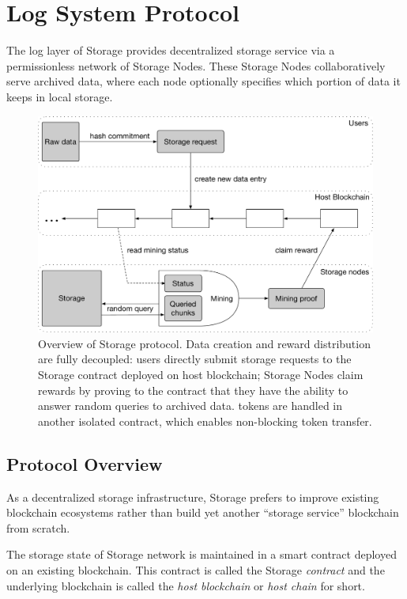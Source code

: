 \section{Log System Protocol}


The log layer of \projabbrev Storage provides decentralized storage service via a permissionless network of Storage Nodes.
These Storage Nodes collaboratively serve archived data,
where each node optionally specifies which portion of data it keeps in local storage.

\begin{figure}[H]
		\includegraphics[width=\textwidth]{figure/protocol_overview.pdf}
		\caption{Overview of \projabbrev Storage protocol. Data creation and reward distribution are fully decoupled: users directly submit storage requests to the \projabbrev Storage contract deployed on host blockchain; Storage Nodes claim rewards by proving to the contract that they have the ability to answer random queries to archived data. \projabbrev tokens are handled in another isolated contract, which enables non-blocking token transfer.}
		\label{fig:overview}
\end{figure}

\subsection{Protocol Overview}

As a decentralized storage infrastructure, \projabbrev Storage prefers to improve existing blockchain ecosystems rather than build yet another ``storage service'' blockchain from scratch.

The storage state of \projabbrev Storage network is maintained in a smart contract deployed on an existing blockchain.
This contract is called the \projabbrev Storage \emph{contract} and the underlying blockchain is called the \emph{host blockchain} or \emph{host chain} for short.

